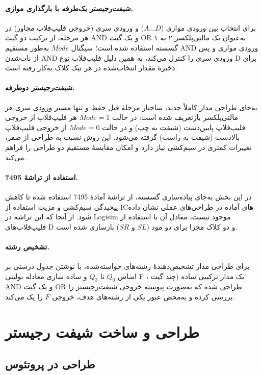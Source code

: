 \documentclass[12pt]{article}
\begin{document}
\paragraph{شیفت‌رجیستر یک‌طرفه با بارگذاری موازی.} برای انتخاب بین ورودی موازی ($A \ldots D$) و ورودی سری (خروجی فلیپ‌فلاپ مجاور) در هر مرحله، از ترکیب دو گیت AND و یک گیت OR به‌عنوان یک مالتی‌پلکسر ۲ به ۱ گسسته استفاده شده است؛  سیگنال $Mode$ به‌طور مستقیم AND ورودی موازی و پس از نات‌شدن AND ورودی سری را کنترل می‌کند، به همین دلیل فلیپ‌فلاپ نوع D برای ذخیرهٔ مقدار انتخاب‌شده در هر تیک کلاک به‌کار رفته است.

\paragraph{شیفت‌رجیستر دوطرفه.} به‌جای طراحی مدار کاملاً جدید، ساختار مرحلهٔ قبل حفظ و تنها مسیر ورودی سری هر مالتی‌پلکسر بازتعریف شده است: در حالت $Mode=1$ هر فلیپ‌فلاپ از خروجی فلیپ‌فلاپ پایین‌دست (شیفت به چپ) و در حالت $Mode=0$ از خروجی فلیپ‌فلاپ بالادست (شیفت به راست) گرفته می‌شود. این روش نسبت به طراحی از صفر، تغییرات کمتری در سیم‌کشی نیاز دارد و امکان مقایسهٔ مستقیم دو طراحی را فراهم می‌کند.

\paragraph{استفاده از تراشهٔ 7495.} در این بخش به‌جای پیاده‌سازی گسسته، از تراشهٔ آمادهٔ 7495 استفاده شده تا کاهش پیچیدگی سیم‌کشی و مزیت استفاده از IC‌های آماده در طراحی‌های عملی نشان داده شود. از آنجا که این تراشه در Logisim موجود نیست، معادل آن با استفاده از فلیپ‌فلاپ‌های D و دو کلاک مجزا برای دو مود ($SL$ و $SR$) بازسازی شده است.

\paragraph{تشخیص رشته.} برای طراحی مدار تشخیص‌دهندهٔ رشته‌های خواسته‌شده، با نوشتن جدول درستی بر اساس $Q_0$ تا $Q_3$ و ساده سازی معادله بولینی F ، یک مدار ترکیبی ساده (چند گیت AND و یک گیت OR\rl{)} طراحی شده که به‌صورت پیوسته خروجی شیفت‌رجیستر را بررسی کرده و به‌محض عبور یکی از رشته‌های هدف، خروجی $F$ را یک می‌کند.

\section{طراحی و ساخت شیفت رجیستر}

\subsection{طراحی در پروتئوس}
\end{document}
